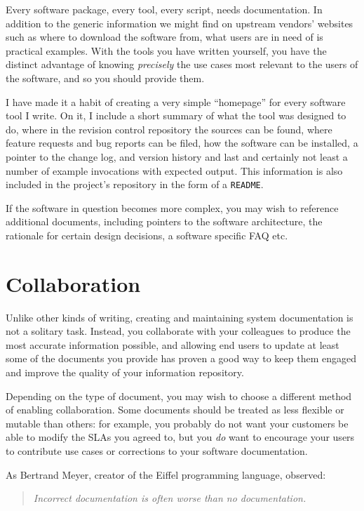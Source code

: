 Every software package, every tool, every script,
needs documentation.  In addition to the generic
information we might find on upstream vendors'
websites such as where to download the software from,
what users are in need of is practical examples.  With
the tools you have written yourself, you have the
distinct advantage of knowing {\em precisely} the use
cases most relevant to the users of the software, and
so you should provide them.

I have made it a habit of creating a very simple
``homepage'' for every software tool I write.  On it,
I include a short summary of what the tool was
designed to do, where in the revision control
repository the sources can be found, where feature
requests and bug reports can be filed, how the
software can be installed, a pointer to the change
log, and version history and last and certainly not
least a number of example invocations with expected
output.  This information is also included in the
project's repository in the form of a {\tt README}.

If the software in question becomes more complex, you
may wish to reference additional documents, including
pointers to the software architecture, the rationale
for certain design decisions, a software specific FAQ
etc.

\section{Collaboration}
\label{documentation:collaboration}

Unlike other kinds of writing, creating and
maintaining system documentation is not a solitary
task.  Instead, you collaborate with your colleagues
to produce the most accurate information possible, and
allowing end users to update at least some of the
documents you provide has proven a good way to keep
them engaged and improve the quality of your
information repository.

Depending on the type of document, you may wish to
choose a different method of enabling collaboration.
Some documents should be treated as less flexible or
mutable than others: for example, you probably do not
want your customers be able to modify the SLAs you
agreed to, but you {\em do} want to encourage your
users to contribute use cases or corrections to your
software documentation.

As Bertrand Meyer,
creator of the Eiffel programming language,
observed:

\begin{quote}
{\em Incorrect documentation is often worse than no documentation.}
\end{quote}

